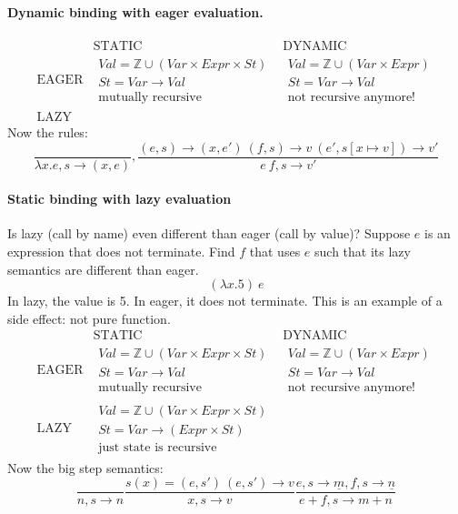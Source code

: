 \documentclass{article}
\begin{document}
\paragraph{Dynamic binding with eager evaluation.}
$$
\begin{matrix}
& \text{STATIC}& \text{DYNAMIC}\\
	\text{EAGER} &
	\begin{matrix}
		Val=\mathbb{Z}\cup (Var\times Expr\times St)\\
		St=Var\rightarrow Val\\
		\text{mutually recursive}
	\end{matrix} &
	\begin{matrix}
		Val=\mathbb{Z}\cup (Var\times Expr)\\
		St=Var\rightarrow Val\\
		\text{not recursive anymore!}
	\end{matrix}\\
\text{LAZY}&&
\end{matrix}
$$
Now the rules:
$$\frac{}{\lambda x.e,s\rightarrow (x, e)},
\frac{(e, s)\rightarrow (x, e')\ (f, s) \rightarrow v\ (e', s[x\mapsto v])\rightarrow v'}{e\ f,s\rightarrow v'}$$
\paragraph{Static binding with lazy evaluation}
Is lazy (call by name) even different than eager (call by value)?
Suppose $ e $ is an expression that does not terminate.
Find $ f $ that uses $ e $ such that its lazy semantics are different than eager.
$$ (\lambda x.5)\ e $$
In lazy, the value is 5. In eager, it does not terminate.
This is an example of a side effect: not pure function.
$$
\begin{array}{c|c|c}
& \text{STATIC}& \text{DYNAMIC}\\\hline
	\text{EAGER} &
	\begin{matrix}
		Val=\mathbb{Z}\cup (Var\times Expr\times St)\\
		St=Var\rightarrow Val\\
		\text{mutually recursive}
	\end{matrix} &
	\begin{matrix}
		Val=\mathbb{Z}\cup (Var\times Expr)\\
		St=Var\rightarrow Val\\
		\text{not recursive anymore!}
	\end{matrix}\\\hline
\text{LAZY} &
	\begin{matrix}
		Val=\mathbb{Z}\cup (Var\times Expr\times St)\\
		St=Var\rightarrow (Expr \times St)\\
		\text{just state is recursive}
	\end{matrix} &
\end{array}
$$
Now the big step semantics:
$$\frac{}{n,s\rightarrow n}\frac{s(x)=(e,s')\ (e,s')\rightarrow v}{x,s\rightarrow v}
\frac{e,s\rightarrow\underline{m}, f,s\rightarrow \underline{n}}{e+f,s\rightarrow m+n}$$
\end{document}
